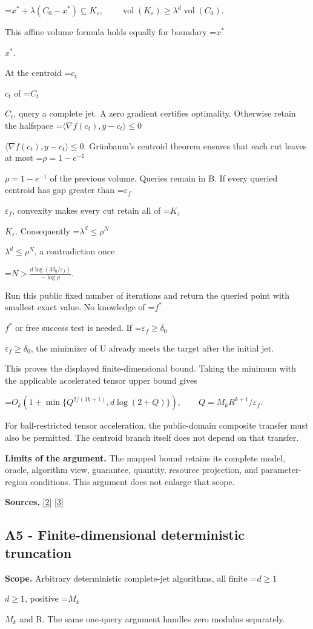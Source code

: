 \documentclass[10pt,a4paper]{article}
\newcommand{\AtlasMath}[1]{\par\begingroup\centering\setbox0=\hbox{$\displaystyle #1$}\ifdim\wd0>1.4\linewidth\typeout{ATLAS WIDE FORMULA: \the\wd0}\fi\ifdim\wd0>\linewidth\resizebox{\linewidth}{!}{\box0}\else\box0\fi\par\endgroup}
\newcommand{\AtlasInlineMath}[1]{\begingroup\setbox0=\hbox{$#1$}\ifdim\wd0>.4\linewidth\endgroup\AtlasMath{#1}\else\endgroup$#1$\fi}
\begin{document}
\AtlasMath{x^*+\lambda(C_0-x^*)\subseteq K_\varepsilon,\qquad
\operatorname{vol}(K_\varepsilon)\ge\lambda^d\operatorname{vol}(C_0).}

This affine volume formula holds equally for boundary \AtlasInlineMath{x^*}.

At the centroid \AtlasInlineMath{c_t} of \AtlasInlineMath{C_t}, query a complete jet. A zero gradient certifies optimality. Otherwise retain the halfspace \AtlasInlineMath{\langle\nabla f(c_t),y-c_t\rangle\le0}. Grünbaum's centroid theorem ensures that each cut leaves at most \AtlasInlineMath{\rho=1-e^{-1}} of the previous volume. Queries remain in B. If every queried centroid has gap greater than \AtlasInlineMath{\varepsilon_f}, convexity makes every cut retain all of \AtlasInlineMath{K_{\varepsilon}}. Consequently \AtlasInlineMath{\lambda^d\le\rho^N}, a contradiction once

\AtlasMath{N>\frac{d\log(3\delta_0/\varepsilon_f)}{-\log\rho}.}

Run this public fixed number of iterations and return the queried point with smallest exact value. No knowledge of \AtlasInlineMath{f^*} or free success test is needed. If \AtlasInlineMath{\varepsilon_f\ge\delta_0}, the minimizer of U already meets the target after the initial jet.

This proves the displayed finite-dimensional bound. Taking the minimum with the applicable accelerated tensor upper bound gives

\AtlasMath{O_k\left(1+\min\{Q^{2/(3k+1)},d\log(2+Q)\}\right),\qquad Q=M_kR^{k+1}/\varepsilon_f.}

For ball-restricted tensor acceleration, the public-domain composite transfer must also be permitted. The centroid branch itself does not depend on that transfer.

\textbf{Limits of the argument.} The mapped bound retains its complete model, oracle, algorithm view, guarantee, quantity, resource projection, and parameter-region conditions. This argument does not enlarge that scope.

\textbf{Sources.} \href{https://msp.org/pjm/1960/10-4/pjm-v10-n4-p18-s.pdf}{[2]} \href{https://arxiv.org/pdf/2205.09647v1}{[3]}

\subsection{A5 - Finite-dimensional deterministic truncation}
\textbf{Scope.} Arbitrary deterministic complete-jet algorithms, all finite \AtlasInlineMath{d\ge1}, positive \AtlasInlineMath{M_k} and R. The same one-query argument handles zero modulus separately.
\end{document}
